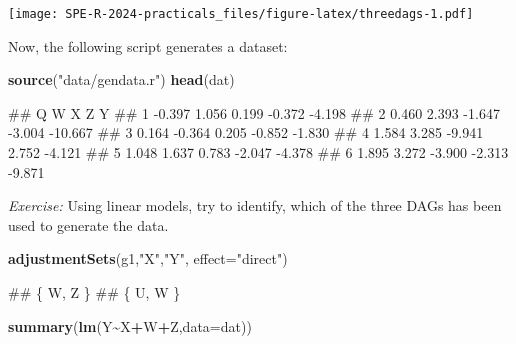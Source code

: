 \documentclass[
]{book}
\newenvironment{Shaded}{\begin{snugshade}}{\end{snugshade}}
\newcommand{\AttributeTok}[1]{\textcolor[rgb]{0.13,0.29,0.53}{#1}}
\newcommand{\FunctionTok}[1]{\textcolor[rgb]{0.13,0.29,0.53}{\textbf{#1}}}
\newcommand{\NormalTok}[1]{#1}
\newcommand{\SpecialCharTok}[1]{\textcolor[rgb]{0.81,0.36,0.00}{\textbf{#1}}}
\newcommand{\StringTok}[1]{\textcolor[rgb]{0.31,0.60,0.02}{#1}}
\begin{document}
\texttt{[image: SPE-R-2024-practicals\_files/figure-latex/threedags-1.pdf]}

Now, the following script generates a dataset:

\begin{Shaded}
\begin{Highlighting}[]
\FunctionTok{source}\NormalTok{(}\StringTok{"data/gendata.r"}\NormalTok{)}
\FunctionTok{head}\NormalTok{(dat)}
\end{Highlighting}
\end{Shaded}

\begin{Shaded}
\begin{Highlighting}[]
\NormalTok{\#\#        Q      W      X      Z       Y}
\NormalTok{\#\# 1 {-}0.397  1.056  0.199 {-}0.372  {-}4.198}
\NormalTok{\#\# 2  0.460  2.393 {-}1.647 {-}3.004 {-}10.667}
\NormalTok{\#\# 3  0.164 {-}0.364  0.205 {-}0.852  {-}1.830}
\NormalTok{\#\# 4  1.584  3.285 {-}9.941  2.752  {-}4.121}
\NormalTok{\#\# 5  1.048  1.637  0.783 {-}2.047  {-}4.378}
\NormalTok{\#\# 6  1.895  3.272 {-}3.900 {-}2.313  {-}9.871}
\end{Highlighting}
\end{Shaded}

\emph{Exercise:} Using linear models, try to identify, which of the three DAGs has been used to generate the data.

\begin{Shaded}
\begin{Highlighting}[]
\FunctionTok{adjustmentSets}\NormalTok{(g1,}\StringTok{"X"}\NormalTok{,}\StringTok{"Y"}\NormalTok{, }\AttributeTok{effect=}\StringTok{"direct"}\NormalTok{)}
\end{Highlighting}
\end{Shaded}

\begin{Shaded}
\begin{Highlighting}[]
\NormalTok{\#\# \{ W, Z \}}
\NormalTok{\#\# \{ U, W \}}
\end{Highlighting}
\end{Shaded}

\begin{Shaded}
\begin{Highlighting}[]
\FunctionTok{summary}\NormalTok{(}\FunctionTok{lm}\NormalTok{(Y}\SpecialCharTok{\textasciitilde{}}\NormalTok{X}\SpecialCharTok{+}\NormalTok{W}\SpecialCharTok{+}\NormalTok{Z,}\AttributeTok{data=}\NormalTok{dat))}
\end{Highlighting}
\end{Shaded}
\end{document}
